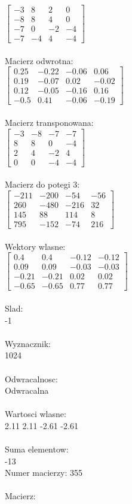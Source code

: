 \documentclass[a4paper,12pt]{article}
\begin{document}
$\begin{bmatrix} -3&8&2&0\\-8&8&4&0\\-7&0&-2&-4\\-7&-4&4&-4 \end{bmatrix}$
\\
\\
Macierz odwrotna:\\

$\begin{bmatrix} 0.25&-0.22&-0.06&0.06\\0.19&-0.07&0.02&-0.02\\0.12&-0.05&-0.16&0.16\\-0.5&0.41&-0.06&-0.19 \end{bmatrix}$
\\
\\
Macierz transponowana:\\

$\begin{bmatrix} -3&-8&-7&-7\\8&8&0&-4\\2&4&-2&4\\0&0&-4&-4 \end{bmatrix}$
\\
\\
Macierz do potegi 3:\\

$\begin{bmatrix} -211&-200&-54&-56\\260&-480&-216&32\\145&88&114&8\\795&-152&-74&216 \end{bmatrix}$
\\
\\
Wektory wlasne:\\

$\begin{bmatrix} 0.4&0.4&-0.12&-0.12\\0.09&0.09&-0.03&-0.03\\-0.21&-0.21&0.02&0.02\\-0.65&-0.65&0.77&0.77 \end{bmatrix}$
\\
\\
Slad:\\
-1
\\
\\
Wyznacznik:\\
1024
\\
\\
Odwracalnosc:\\
Odwracalna
\\
\\
Wartosci wlasne:\\
2.11 2.11 -2.61 -2.61
\\
\\
Suma elementow:\\
-13
\\
\newpage
Numer macierzy:
355
\\
\\
Macierz:\\
\end{document}
